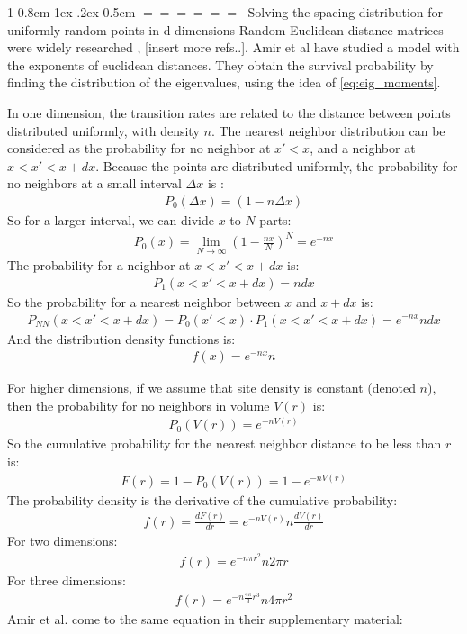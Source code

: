 \documentclass[onecolumn,fleqn,notitlepage,secnumarabic]{revtex4}
\makeatletter
\def\section{%
  \@startsection
    {section}%
    {1}%
    {\z@}%
    {0.8cm \@plus1ex \@minus .2ex}%
    {0.5cm}%
    {\Large\bf $=\!=\!=\!=\!=\!=\;$}%
}%
\makeatother
\begin{document}
\section{Solving the spacing distribution for uniformly random points in d dimensions} \label{subsec:euclid}
Random Euclidean distance matrices were widely researched \cite{Mezard:1999:NPB}, [insert more refs..]. Amir et al \cite{Amir:2010:PRL} have studied a model with the exponents of euclidean distances. They obtain the survival probability by finding the distribution of the eigenvalues, using the idea of \ref{eq:eig_moments}. 

In one dimension, the transition rates are related to the distance between points distributed uniformly, with density $n$. The nearest neighbor distribution can be considered as the probability for no neighbor at $x'<x$, and a neighbor at $x<x'<x+dx$. Because the points are distributed uniformly, the probability for no neighbors at a small interval $\Delta x$ is :
\begin{align}P_0(\Delta x) = (1-n\Delta x) \end{align}
So for a larger interval, we can divide $x$ to $N$ parts:
\begin{align}P_0(x) = \lim_{N\rightarrow \infty}(1-\frac{nx}{N})^N = e^{-n x} \end{align}
The probability for a neighbor at $x<x'<x+dx$ is:
\begin{align}P_1(x<x'<x+dx) = n dx \end{align}
So the probability for a nearest neighbor between $x$ and $x+dx$ is:
\begin{align}P_{NN}(x< x'<x+dx) = P_0(x'<x)\cdot P_1(x<x'<x+dx) = e^{-n x}ndx \end{align}
And the distribution density functions is:
\begin{align} f(x) = e^{-n x}n\end{align}

For higher dimensions, if we assume that site density is constant (denoted $n$), then the probability for no neighbors in volume $V(r)$ is:
\begin{align} P_0( V(r)) = e^{-nV(r)}\end{align}
So the cumulative probability for the nearest neighbor distance to be less than $r$ is:
\begin{align} F (r) = 1-P_0(V(r)) = 1- e^{-nV(r)} \end{align}
The probability density is the derivative of the cumulative probability:
\begin{align} f(r) = \frac{dF(r)}{dr} =   e^{-nV(r)} n \frac{dV(r)}{dr} \end{align}
For two dimensions:
\begin{align} f(r) = e^{-n \pi r^2}n2\pi r \end{align}
For three dimensions:
\begin{align} f(r) = e^{-n \frac{4\pi}{3} r^3}n4\pi r^2 \end{align}
Amir et al. \cite{Amir:2010:PRL} come to the same equation in their supplementary material:
\end{document}
